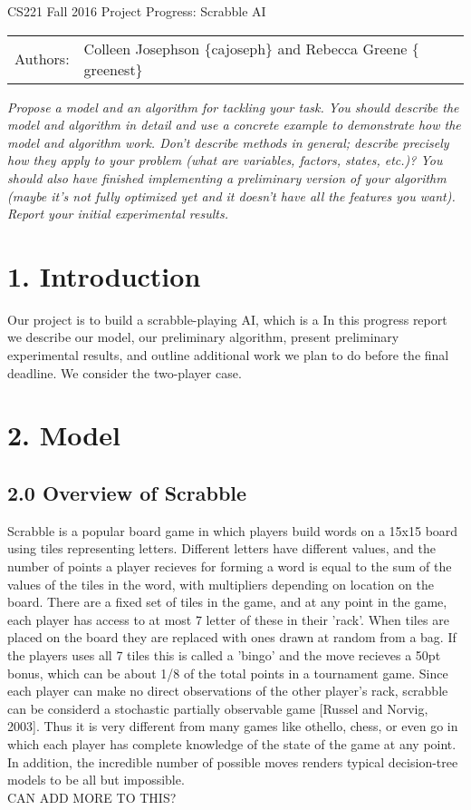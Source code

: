 \documentclass[12pt]{article}
\begin{document}
\begin{center}
{\Large CS221 Fall 2016 Project Progress: Scrabble AI}

\begin{tabular}{rl}
  Authors: & Colleen Josephson $\{$cajoseph$\}$ and Rebecca Greene $\{$greenest$\}$\\
\end{tabular}
\end{center}

\emph{Propose a model and an algorithm for tackling your task. You should
describe the model and algorithm in detail and use a concrete example
to demonstrate how the model and algorithm work. Don't describe
methods in general; describe precisely how they apply to your problem
(what are variables, factors, states, etc.)? You should also have
finished implementing a preliminary version of your algorithm (maybe
it's not fully optimized yet and it doesn't have all the features you
want). Report your initial experimental results.}


\section*{1. Introduction}

	

Our project is to build a scrabble-playing AI, which is a  In
this progress report we describe our model, our preliminary algorithm,
present preliminary experimental results, and outline additional work
we plan to do before the final deadline. We consider the two-player case. 


\section*{2. Model}
\subsection*{2.0 Overview of Scrabble}
Scrabble is a popular board game in which players build words on a 15x15 board using tiles representing letters. Different letters have different values, and the number of points a player recieves for forming a word is equal to the sum of the values of the tiles in the word, with multipliers depending on location on the board. There are a fixed set of tiles in the game, and at any point in the game, each player has access to at most 7 letter of these in their 'rack'.  When tiles are placed on the board they are replaced with ones drawn at random from a bag. If the players uses all 7 tiles this is called a 'bingo' and the move recieves a 50pt bonus, which can be about 1/8 of the total points in a tournament game.  Since each player can make no direct observations of the other player's rack, scrabble can be considerd a stochastic partially observable game [Russel and Norvig, 2003].  Thus it is very different from many games like othello, chess, or even go in which each player has complete knowledge of the state of the game at any point. In addition, the incredible number of possible moves renders typical decision-tree models to be all but impossible. \\
CAN ADD MORE TO THIS? 
\end{document}
